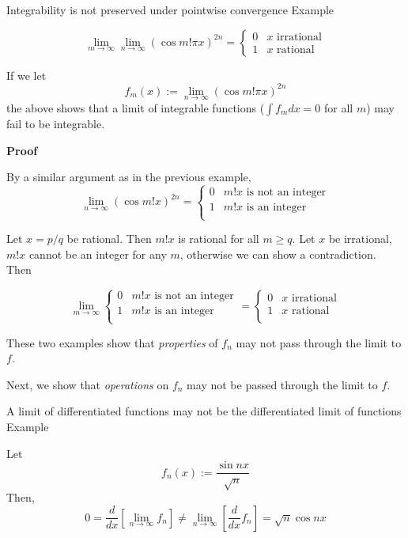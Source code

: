 \begin{result}
    {Integrability is not preserved under pointwise convergence}
    {Example}

    \[\lim_{m \to \infty} \lim_{n \to \infty} (\cos m!\pi x ) ^{2n} = \begin{cases}
        0 & x\text{ irrational} \\
        1 & x\text{ rational}
    \end{cases}\]

    If we let 
    \[f_m (x) := \lim_{n \to \infty} (\cos m!\pi x)^{2n}\]
    the above shows that a limit of integrable functions ($\int f_m dx = 0$ for all $m$) may fail to be integrable.

    \textbf{Proof}

    By a similar argument as in the previous example,
    \[\lim_{n \to \infty} (\cos m!x)^{2n} = \begin{cases}
        0 & m!x\text{ is not an integer} \\
        1 & m!x\text{ is an integer} \\
    \end{cases}\]

    Let $x = p/q$ be rational. Then $m!x$ is rational for all $m \geq q$. Let $x$ be irrational, $m!x$ cannot be an integer for any $m$, otherwise we can show a contradiction. Then

    \[\lim_{m \to \infty} \begin{cases}
        0 & m!x\text{ is not an integer} \\
        1 & m!x\text{ is an integer} \\
        \end{cases} = \begin{cases}
        0 & x \text{ irrational} \\
        1 & x \text{ rational} \\
    \end{cases}\]
\end{result} 

These two examples show that \textit{properties} of $f_n$ may not pass through the limit to $f$. 

Next, we show that \textit{operations} on $f_n$ may not be passed through the limit to $f$.

\begin{result}
    {A limit of differentiated functions may not be the differentiated limit of functions}
    {Example}

    Let 
    \[f_n(x) := \frac{\sin nx}{\sqrt{n}}\]
    Then,
    \[0 = \frac{d}{dx}\left[\lim_{n \to \infty} f_n \right]\neq \lim_{n \to \infty} \left[\frac{d}{dx} f_n\right] = \sqrt{n}\cos nx\]
\end{result}

